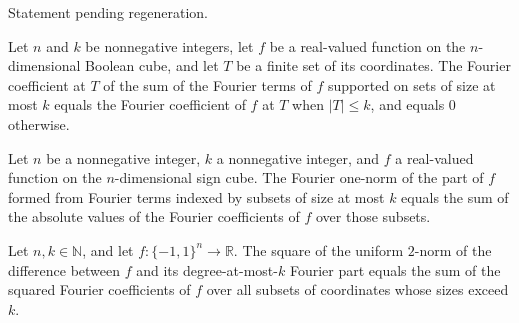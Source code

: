 \begin{theorem}
\label{FABL.lowDegreePart_eq_sparseFourierApproximation}
\leanok
{}
Statement pending regeneration.
\end{theorem}

\begin{theorem}
\label{FABL.fourierCoeff_lowDegreePart}
\leanok
{}
Let $n$ and $k$ be nonnegative integers, let $f$ be a real-valued function on the
$n$-dimensional Boolean cube, and let $T$ be a finite set of its coordinates. The
Fourier coefficient at $T$ of the sum of the Fourier terms of $f$ supported on sets of
size at most $k$ equals the Fourier coefficient of $f$ at $T$ when $|T|\le k$, and
equals $0$ otherwise.
\end{theorem}

\begin{theorem}
\label{FABL.fourierOneNorm_lowDegreePart}
\leanok
{}
Let $n$ be a nonnegative integer, $k$ a nonnegative integer, and $f$ a real-valued
function on the $n$-dimensional sign cube. The Fourier one-norm of the part of $f$
formed from Fourier terms indexed by subsets of size at most $k$ equals the sum of the
absolute values of the Fourier coefficients of $f$ over those subsets.
\end{theorem}

\begin{theorem}
\label{FABL.uniformLpNorm_sub_lowDegreePart_sq}
\leanok
{}
Let $n,k\in\mathbb{N}$, and let $f:\{-1,1\}^n\to\mathbb{R}$. The square of the uniform
$2$-norm of the difference between $f$ and its degree-at-most-$k$ Fourier part equals
the sum of the squared Fourier coefficients of $f$ over all subsets of coordinates whose
sizes exceed $k$.
\end{theorem}

